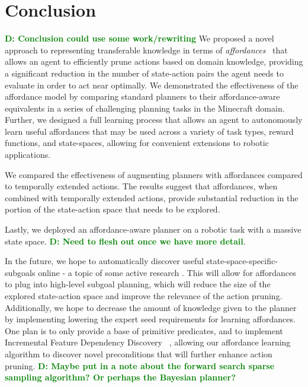 \documentclass[conference]{IEEEtran}
\newcommand{\dnote}[1]{\textcolor{Green}{\textbf{D: #1}}}
\begin{document}
\section{Conclusion}
\label{sec:conclusion}
\dnote{Conclusion could use some work/rewriting}
We proposed a novel approach to representing transferable knowledge in terms of
{\em affordances}~\cite{gibson77} that allows an agent to efficiently prune actions 
based on domain knowledge, providing a significant reduction in the number of state-action
pairs the agent needs to evaluate in order to act near optimally. We demonstrated the 
effectiveness of the affordance model by comparing standard planners to their affordance-aware
equivalents in a series of challenging planning tasks in the Minecraft domain. Further, we designed
a full learning process that allows an agent to autonomously learn useful affordances that may be used
across a variety of task types, reward functions, and state-spaces, allowing for convenient extensions 
to robotic applications.

We compared the effectiveness of augmenting planners with affordances compared to 
temporally extended actions. The results suggest that affordances, when combined with 
temporally extended actions, provide substantial reduction in the portion of the state-action 
space that needs to be explored.

Lastly, we deployed an affordance-aware planner on a robotic task with a massive 
state space. \dnote{Need to flesh out once we have more detail}.

In the future, we hope to automatically discover useful state-space-specific-subgoals online 
- a topic of some active research \cite{Mcgovern01automaticdiscovery,Simsek:2005:IUS:1102351.1102454}.
This will allow for affordances to plug into high-level subgoal planning, which will reduce the size of the 
explored state-action space and improve the relevance of the action pruning. Additionally, we hope to 
decrease the amount of knowledge given to the planner by implementing lowering the expert seed 
requirements for learning affordances. One plan is to only provide a base of primitive predicates, and 
to implement Incremental Feature Dependency Discovery ~\cite{ICML2011Geramifard_473}, allowing 
our affordance learning algorithm to discover novel preconditions that will further enhance action pruning.
\dnote{Maybe put in a note about the forward search sparse sampling algorithm? Or perhaps the Bayesian planner?}

{\small


}
\end{document}
